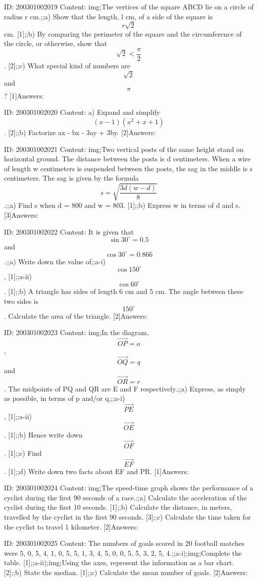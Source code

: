 \documentclass{article}
\begin{document}
ID: 200301002019
Content:
img;The vertices of the square ABCD lie on a circle of radius r cm.;;a) Show that the length, l cm, of a side of the square is $$r \sqrt{2}$$ cm. [1];;b) By comparing the perimeter of the square and the circumference of the circle, or otherwise, show that $$\sqrt{2} < \frac{\pi}{2}$$. [2];;c) What special kind of numbers are $$\sqrt{2}$$ and $$\pi$$? [1]Answers:

ID: 200301002020
Content:
a) Expand and simplify $$(x-1)(x^{2} +x+1)$$. [2];;b) Factorize ax - bx - 3ay + 3by. [2]Answers:

ID: 200301002021
Content:
img;Two vertical posts of the same height stand on horizontal ground. The distance between the posts is d centimeters. When a wire of length w centimeters is suspended between the posts, the sag in the middle is s centimeters. The sag is given by the formula $$s=\sqrt{\frac{3d(w-d)}{8}}$$.;;a) Find s when d = 800 and w = 803. [1];;b) Express w in terms of d and s. [3]Answers:

ID: 200301002022
Content:
It is given that $$\sin 30^{\circ}=0.5$$ and $$\cos30^{\circ} = 0.866$$.;;a) Write down the value of;;a-i) $$\cos 150^{\circ}$$, [1];;a-ii) $$\cos 60^{\circ}$$. [1];;b) A triangle has sides of length 6 cm and 5 cm. The angle between these two sides is $$150^{\circ}$$. Calculate the area of the triangle. [2]Answers:

ID: 200301002023
Content:
img;In the diagram, $$\vec{OP}=o$$, $$\vec{OQ}=q$$ and $$\vec{OR}=r$$. The midpoints of PQ and QR are E and F respectively.;;a) Express, as simply as possible, in terms of p and/or q,;;a-i) $$\vec{PE}$$, [1];;a-ii) $$\vec{OE}$$. [1];;b) Hence write down $$\vec{OF}$$. [1];;c) Find $$\vec{EF}$$. [1];;d) Write down two facts about EF and PR. [1]Answers:

ID: 200301002024
Content:
img;The speed-time graph shows the performance of a cyclist during the first 90 seconds of a race.;;a) Calculate the acceleration of the cyclist during the first 10 seconds. [1];;b) Calculate the distance, in meters, travelled by the cyclist in the first 90 seconds. [3];;c) Calculate the time taken for the cyclist to travel 1 kilometer. [2]Answers:

ID: 200301002025
Content:
The numbers of goals scored in 20 football matches were 5, 0, 5, 4, 1, 0, 5, 5, 1, 3, 4, 5, 0, 0, 5, 5, 3, 2, 5, 4.;;a-i);img;Complete the table. [1];;a-ii);img;Using the axes, represent the information as a bar chart. [2];;b) State the median. [1];;c) Calculate the mean number of goals. [2]Answers:
\end{document}
